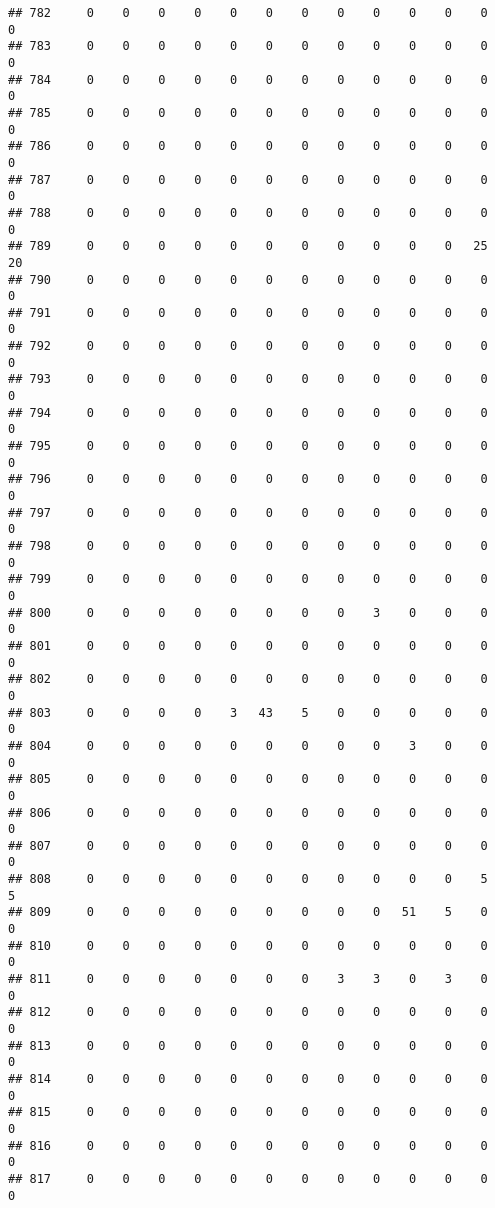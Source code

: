 \documentclass[]{article}
\begin{document}
\begin{verbatim}
## 782     0    0    0    0    0    0    0    0    0    0    0    0    0
## 783     0    0    0    0    0    0    0    0    0    0    0    0    0
## 784     0    0    0    0    0    0    0    0    0    0    0    0    0
## 785     0    0    0    0    0    0    0    0    0    0    0    0    0
## 786     0    0    0    0    0    0    0    0    0    0    0    0    0
## 787     0    0    0    0    0    0    0    0    0    0    0    0    0
## 788     0    0    0    0    0    0    0    0    0    0    0    0    0
## 789     0    0    0    0    0    0    0    0    0    0    0   25   20
## 790     0    0    0    0    0    0    0    0    0    0    0    0    0
## 791     0    0    0    0    0    0    0    0    0    0    0    0    0
## 792     0    0    0    0    0    0    0    0    0    0    0    0    0
## 793     0    0    0    0    0    0    0    0    0    0    0    0    0
## 794     0    0    0    0    0    0    0    0    0    0    0    0    0
## 795     0    0    0    0    0    0    0    0    0    0    0    0    0
## 796     0    0    0    0    0    0    0    0    0    0    0    0    0
## 797     0    0    0    0    0    0    0    0    0    0    0    0    0
## 798     0    0    0    0    0    0    0    0    0    0    0    0    0
## 799     0    0    0    0    0    0    0    0    0    0    0    0    0
## 800     0    0    0    0    0    0    0    0    3    0    0    0    0
## 801     0    0    0    0    0    0    0    0    0    0    0    0    0
## 802     0    0    0    0    0    0    0    0    0    0    0    0    0
## 803     0    0    0    0    3   43    5    0    0    0    0    0    0
## 804     0    0    0    0    0    0    0    0    0    3    0    0    0
## 805     0    0    0    0    0    0    0    0    0    0    0    0    0
## 806     0    0    0    0    0    0    0    0    0    0    0    0    0
## 807     0    0    0    0    0    0    0    0    0    0    0    0    0
## 808     0    0    0    0    0    0    0    0    0    0    0    5    5
## 809     0    0    0    0    0    0    0    0    0   51    5    0    0
## 810     0    0    0    0    0    0    0    0    0    0    0    0    0
## 811     0    0    0    0    0    0    0    3    3    0    3    0    0
## 812     0    0    0    0    0    0    0    0    0    0    0    0    0
## 813     0    0    0    0    0    0    0    0    0    0    0    0    0
## 814     0    0    0    0    0    0    0    0    0    0    0    0    0
## 815     0    0    0    0    0    0    0    0    0    0    0    0    0
## 816     0    0    0    0    0    0    0    0    0    0    0    0    0
## 817     0    0    0    0    0    0    0    0    0    0    0    0    0

\end{verbatim}
\end{document}
